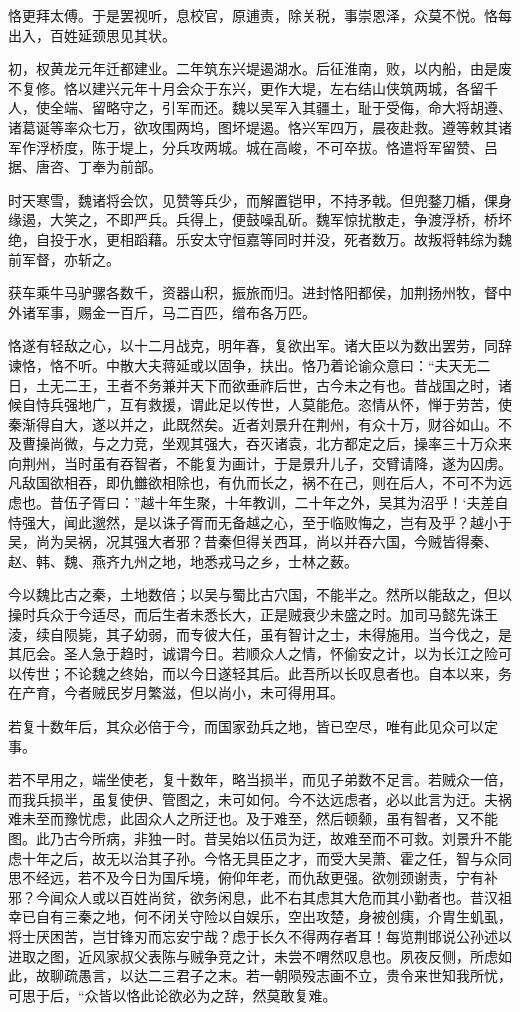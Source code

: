 \documentclass[12pt,UTF8]{ctexbook}
\begin{document}
恪更拜太傅。于是罢视听，息校官，原逋责，除关税，事崇恩泽，众莫不悦。恪每出入，百姓延颈思见其状。

初，权黄龙元年迁都建业。二年筑东兴堤遏湖水。后征淮南，败，以内船，由是废不复修。恪以建兴元年十月会众于东兴，更作大堤，左右结山侠筑两城，各留千人，使全端、留略守之，引军而还。魏以吴军入其疆土，耻于受侮，命大将胡遵、诸葛诞等率众七万，欲攻围两坞，图坏堤遏。恪兴军四万，晨夜赴救。遵等敕其诸军作浮桥度，陈于堤上，分兵攻两城。城在高峻，不可卒拔。恪遣将军留赞、吕据、唐咨、丁奉为前部。

时天寒雪，魏诸将会饮，见赞等兵少，而解置铠甲，不持矛戟。但兜鍪刀楯，倮身缘遏，大笑之，不即严兵。兵得上，便鼓噪乱斫。魏军惊扰散走，争渡浮桥，桥坏绝，自投于水，更相蹈藉。乐安太守恒嘉等同时并没，死者数万。故叛将韩综为魏前军督，亦斩之。

获车乘牛马驴骡各数千，资器山积，振旅而归。进封恪阳都侯，加荆扬州牧，督中外诸军事，赐金一百斤，马二百匹，缯布各万匹。

恪遂有轻敌之心，以十二月战克，明年春，复欲出军。诸大臣以为数出罢劳，同辞谏恪，恪不听。中散大夫蒋延或以固争，扶出。恪乃着论谕众意曰：“夫天无二日，土无二王，王者不务兼并天下而欲垂祚后世，古今未之有也。昔战国之时，诸候自恃兵强地广，互有救援，谓此足以传世，人莫能危。恣情从怀，惮于劳苦，使秦渐得自大，遂以并之，此既然矣。近者刘景升在荆州，有众十万，财谷如山。不及曹操尚微，与之力竞，坐观其强大，吞灭诸袁，北方都定之后，操率三十万众来向荆州，当时虽有吞智者，不能复为画计，于是景升儿子，交臂请降，遂为囚虏。凡敌国欲相吞，即仇雦欲相除也，有仇而长之，祸不在己，则在后人，不可不为远虑也。昔伍子胥曰：”越十年生聚，十年教训，二十年之外，吴其为沼乎！‘夫差自恃强大，闻此邈然，是以诛子胥而无备越之心，至于临败悔之，岂有及乎？越小于吴，尚为吴祸，况其强大者邪？昔秦但得关西耳，尚以并吞六国，今贼皆得秦、赵、韩、魏、燕齐九州之地，地悉戎马之乡，士林之薮。

今以魏比古之秦，土地数倍；以吴与蜀比古穴国，不能半之。然所以能敌之，但以操时兵众于今适尽，而后生者未悉长大，正是贼衰少未盛之时。加司马懿先诛王淩，续自陨毙，其子幼弱，而专彼大任，虽有智计之士，未得施用。当今伐之，是其厄会。圣人急于趋时，诚谓今日。若顺众人之情，怀偷安之计，以为长江之险可以传世；不论魏之终始，而以今日遂轻其后。此吾所以长叹息者也。自本以来，务在产育，今者贼民岁月繁滋，但以尚小，未可得用耳。

若复十数年后，其众必倍于今，而国家劲兵之地，皆已空尽，唯有此见众可以定事。

若不早用之，端坐使老，复十数年，略当损半，而见子弟数不足言。若贼众一倍，而我兵损半，虽复使伊、管图之，未可如何。今不达远虑者，必以此言为迂。夫祸难未至而豫忧虑，此固众人之所迂也。及于难至，然后顿颡，虽有智者，又不能图。此乃古今所病，非独一时。昔吴始以伍员为迂，故难至而不可救。刘景升不能虑十年之后，故无以治其子孙。今恪无具臣之才，而受大吴萧、霍之任，智与众同思不经远，若不及今日为国斥境，俯仰年老，而仇敌更强。欲刎颈谢责，宁有补邪？今闻众人或以百姓尚贫，欲务闲息，此不右其虑其大危而其小勤者也。昔汉祖幸已自有三秦之地，何不闭关守险以自娱乐，空出攻楚，身被创痍，介胄生虮虱，将士厌困苦，岂甘锋刃而忘安宁哉？虑于长久不得两存者耳！每览荆邯说公孙述以进取之图，近风家叔父表陈与贼争竞之计，未尝不喟然叹息也。夙夜反侧，所虑如此，故聊疏愚言，以达二三君子之末。若一朝陨殁志画不立，贵令来世知我所忧，可思于后，“众皆以恪此论欲必为之辞，然莫敢复难。
\end{document}
